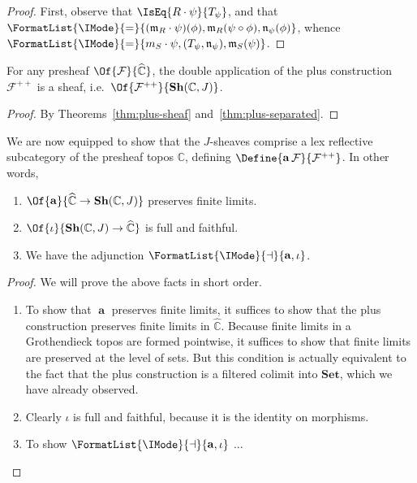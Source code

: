 \documentclass{article}
\newcommand\Sets{\mathbf{Set}}
\newcommand\Psh[1]{\widehat{#1}}
\newcommand\Sh[1]{\mathbf{Sh} (#1)}
\newcommand\AreEq[1]{\FormatList{\IMode}{=}{#1}}
\DeclareMathOperator{\Sheafify}{\mathbf{a}}
\newcommand\AreAdjoint[1]{\FormatList{\IMode}{\dashv}{#1}}
\newcommand\PlusPlus[1]{{#1}^{++}}
\begin{document}
\begin{proof}
  First, observe that $\IsEq{R\cdot\psi}{T_\psi}$, and that
  $\AreEq{(\mathfrak{m}_R\cdot\psi)(\phi),\mathfrak{m}_R(\psi\circ\phi),\mathfrak{n}_\psi(\phi)}$,
  whence
  $\AreEq{m_S\cdot\psi,{(T_\psi,\mathfrak{n}_\psi)},\mathfrak{m}_S(\psi)}$.
\end{proof}

\begin{cor}
  For any presheaf $\Of{\mathcal{F}}{\Psh{\mathbb{C}}}$, the double application
  of the plus construction $\PlusPlus{\mathcal{F}}$ is a sheaf, i.e.\
  $\Of{\PlusPlus{\mathcal{F}}}{\Sh{\mathbb{C},J}}$.
\end{cor}
\begin{proof}
  By Theorems~\ref{thm:plus-sheaf} and~\ref{thm:plus-separated}.
\end{proof}



\begin{thm}[Sheafification]
  We are now equipped to show that the $J$-sheaves comprise a lex
  reflective subcategory of the presheaf topos $\mathbb{C}$, defining
  $\Define{\Sheafify{\mathcal{F}}}{\PlusPlus{\mathcal{F}}}$. In other words,
  \begin{enumerate}
  \item $\Of{\Sheafify}{\Psh{\mathbb{C}}\to\Sh{\mathbb{C},J}}$
    preserves finite limits.
  \item $\Of{\iota}{\Sh{\mathbb{C},J}\to\Psh{\mathbb{C}}}$ is full and
    faithful.
  \item We have the adjunction $\AreAdjoint{\Sheafify,\iota}$.
  \end{enumerate}
\end{thm}
\begin{proof}
\newcommand\Amalg[1]{\llparenthesis{#1}\rrparenthesis}
  We will prove the above facts in short order.

  \begin{enumerate}
  \item To show that $\Sheafify$ preserves finite limits, it suffices
    to show that the plus construction preserves finite limits in
    $\Psh{\mathbb{C}}$. Because finite limits in a Grothendieck topos
    are formed pointwise, it suffices to show that finite limits are
    preserved at the level of sets. But this condition is actually
    equivalent to the fact that the plus construction is a filtered
    colimit into $\Sets$, which we have already observed.
  \item Clearly $\iota$ is full and faithful, because it is the identity
    on morphisms.
  \item To show $\AreAdjoint{\Sheafify,\iota}$ ...
    
  \end{enumerate}
\end{proof}
\end{document}
